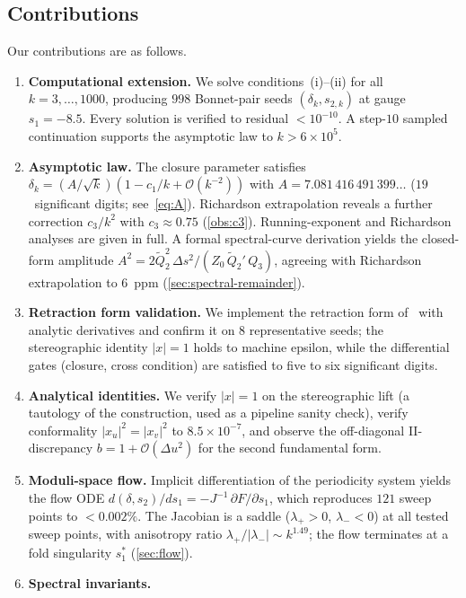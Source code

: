 \documentclass[11pt,a4paper]{article}
\theoremstyle{plain}
\theoremstyle{definition}
\theoremstyle{remark}
\newcommand{\abs}[1]{\lvert #1 \rvert}
\newcommand{\Oo}{\mathcal{O}}
\begin{document}
\subsection{Contributions}
Our contributions are as follows.
\begin{enumerate}[label=\textbf{C\arabic*}.,nosep]
\item \textbf{Computational extension.} We solve conditions~(i)--(ii)
  for all $k = 3,\ldots,1000$, producing $998$ Bonnet-pair seeds
  $(\delta_k, s_{2,k})$ at gauge $s_1 = -8.5$.  Every solution is
  verified to residual $< 10^{-10}$.  A step-$10$ sampled
  continuation supports the asymptotic law to $k > 6\times 10^5$.
\item \textbf{Asymptotic law.}
  The closure parameter satisfies
  $\delta_k = (A/\sqrt{k})(1 - c_1/k + \Oo(k^{-2}))$
  with $A = 7.081\,416\,491\,399\ldots$ ($19$~significant digits;
  see~\eqref{eq:A}).
  Richardson extrapolation reveals a further correction
  $c_3/k^2$ with $c_3 \approx 0.75$ (\cref{obs:c3}).
  Running-exponent and Richardson analyses are given in full.
  A formal spectral-curve derivation yields the closed-form
  amplitude $A^2 = 2\tilde Q_2^2\,\Delta s^2/(Z_0\,\tilde Q_2'\,Q_3)$,
  agreeing with Richardson extrapolation to $6$~ppm
  (\cref{sec:spectral-remainder}).
\item \textbf{Retraction form validation.}
  We implement the retraction form of~\cite{BCHR25} with analytic
  derivatives and confirm it on $8$ representative seeds;
  the stereographic identity $\abs{x}=1$ holds to machine
  epsilon, while the differential gates (closure, cross condition)
  are satisfied to five to six significant digits.
\item \textbf{Analytical identities.}
  We verify $\abs{x} = 1$ on the stereographic lift (a tautology
  of the construction, used as a pipeline sanity check),
  verify conformality $\abs{x_u}^2 = \abs{x_v}^2$ to
  $8.5 \times 10^{-7}$, and observe the off-diagonal
  II-discrepancy $b = 1 + \Oo(\Delta u^2)$ for the
  second fundamental form.
\item \textbf{Moduli-space flow.}
  Implicit differentiation of the periodicity system yields the
  flow ODE $d(\delta, s_2)/ds_1 = -J^{-1}\,\partial F/\partial s_1$,
  which reproduces $121$ sweep points to $< 0.002\%$.
  The Jacobian is a saddle ($\lambda_+ > 0$, $\lambda_- < 0$)
  at all tested sweep points, with anisotropy ratio $\lambda_+/\abs{\lambda_-}
  \sim k^{1.49}$; the flow terminates at a fold singularity
  $s_1^*$ (\cref{sec:flow}).
\item \textbf{Spectral invariants.}

\end{enumerate}
\end{document}
